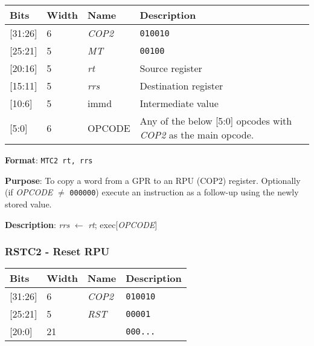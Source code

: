 \documentclass[11pt]{article}
\begin{document}
\begin{table}[H] \centering
  \def\arraystretch{1.4}
  \begin{tabular}{|m{2cm}|m{1.5cm}|m{2.5cm}|m{4.5cm}|}
    \hline
    \textbf{Bits} & \textbf{Width} & \textbf{Name} & \textbf{Description}\\ \hline

    [31:26] & 6 & \emph{COP2} & \texttt{010010}\\ \hline

    [25:21] & 5 & \emph{MT} & \texttt{00100}\\ \hline

    [20:16] & 5 & \emph{rt} & Source register\\ \hline

    [15:11] & 5 & \emph{rrs} & Destination register\\ \hline
    
    [10:6] & 5 & immd & Intermediate value\\ \hline

    [5:0] & 6 & OPCODE & Any of the below [5:0] opcodes with \emph{COP2} as the main opcode.\\ \hline
  \end{tabular}
\end{table}

\textbf{Format}: \texttt{MTC2 rt, rrs}

\textbf{Purpose}: To copy a word from a GPR to an RPU (COP2) register. Optionally (if \emph{OPCODE} $\neq$ \texttt{000000}) execute an instruction as a follow-up using the newly stored value.

\textbf{Description}: \emph{rrs} $\leftarrow$ \emph{rt}; exec[\emph{OPCODE}]

\text{}
\subsubsection{RSTC2 - Reset RPU}
\text{}

\begin{table}[H] \centering
  \def\arraystretch{1.4}
  \begin{tabular}{|m{2cm}|m{1.5cm}|m{2.5cm}|m{4.5cm}|}
    \hline
    \textbf{Bits} & \textbf{Width} & \textbf{Name} & \textbf{Description}\\ \hline

    [31:26] & 6 & \emph{COP2} & \texttt{010010}\\ \hline

    [25:21] & 5 & \emph{RST} & \texttt{00001}\\ \hline

    [20:0] & 21 & & \texttt{000...}\\ \hline
  \end{tabular}
\end{table}
\end{document}
